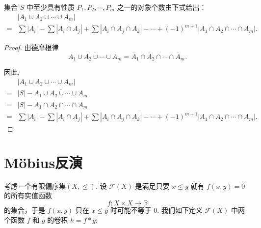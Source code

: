 \begin{theorem}[容斥原理]
    集合 $S$ 中至少具有性质 $P_1, P_2, \cdots, P_m$ 之一的对象个数由下式给出：
    \begin{align*}
         & |A_1 \cup A_2 \cup \cdots \cup A_m| \\=&\sum |A_i| - \sum |A_i \cap A_j| + \sum |A_i \cap A_j \cap A_k| - \cdots + (-1)^{m+1} |A_1 \cap A_2 \cap \cdots \cap A_m|.
    \end{align*}
\end{theorem}
\begin{proof}
    由德摩根律
    $$\overline{A_1 \cup A_2 \cup \cdots \cup A_m} = \overline{A}_1 \cap \overline{A}_2 \cap \cdots \cap \overline{A}_m.$$

    因此,
    \begin{align*}
          & |A_1 \cup A_2 \cup \cdots \cup A_m|                                                                                        \\=&|S|-\overline{A_1 \cup A_2 \cup \cdots \cup A_m}\\
        = & |S|-\overline{A}_1 \cap \overline{A}_2 \cap \cdots \cap \overline{A}_m                                                     \\
        = & \sum |A_i| - \sum |A_i \cap A_j| + \sum |A_i \cap A_j \cap A_k| - \cdots + (-1)^{m+1} |A_1 \cap A_2 \cap \cdots \cap A_m|.
    \end{align*}
\end{proof}

\section{Möbius反演}
考虑一个有限偏序集$(X,\leq)$. 设 $\mathcal{F}(X)$ 是满足只要 $x \leq y$ 就有 $f(x, y) = 0$ 的所有实值函数
\[ f : X \times X \rightarrow \mathbb{R} \]
的集合，于是 $f(x, y)$ 只在 $x \leq y$ 时可能不等于 0. 我们如下定义 $\mathcal{F}(X)$ 中两个函数 $f$ 和 $g$ 的卷积 $h = f * g$:

